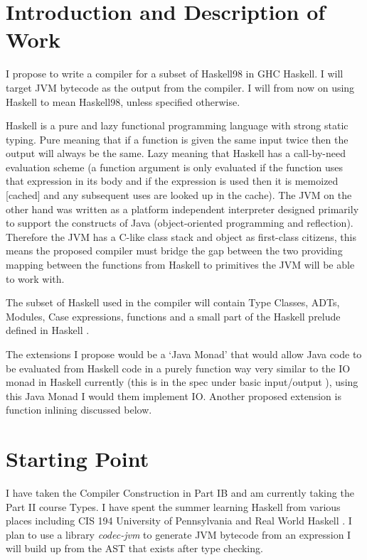 \documentclass[a4paper,12pt]{article}
\begin{document}
\section*{Introduction and Description of Work}

  I propose to write a compiler for a subset of Haskell98 in GHC Haskell. I will target JVM bytecode as the output from
  the compiler. I will from now on using Haskell to mean Haskell98, unless specified otherwise.

  Haskell is a pure and lazy functional programming language with strong static typing. Pure meaning that
  if a function is given the same input twice then the output will always be the same. Lazy meaning that Haskell has a 
  call-by-need evaluation scheme (a function argument is only evaluated if the function uses that expression in its body
  and if the expression is used then it is memoized [cached] and any subsequent uses are looked up in the cache).
  The JVM on the other hand was  written as a platform independent interpreter designed 
  primarily to support the constructs of Java (object-oriented programming and reflection). 
  Therefore the JVM has a C-like class stack and object as first-class citizens, this means
  the proposed compiler must bridge the gap between the two providing mapping between the functions from Haskell to primitives
  the JVM will be able to work with.

  The subset of Haskell used in the compiler will contain Type Classes, ADTs, Modules, Case expressions, 
  functions and a small part of the Haskell prelude defined in Haskell \cite{haskell98-spec}. 

  The extensions I propose would be a `Java Monad' that would allow Java code to be evaluated from Haskell code in a
  purely function way very similar to the IO monad in Haskell currently (this is in the spec under basic input/output \cite{haskell98-spec}), using this Java Monad
  I would them implement IO. Another proposed extension is function inlining discussed below.


\section*{Starting Point}
  I have taken the Compiler Construction in Part IB and am currently taking the Part II course Types. I have spent the summer
  learning Haskell from various places including CIS 194 University of Pennsylvania \cite{cis194} and Real World Haskell \cite{realwordhaskell}.
  I plan to use a library \textit{codec-jvm} to generate JVM bytecode from an expression I will build up from the AST that exists after type checking.
\end{document}
